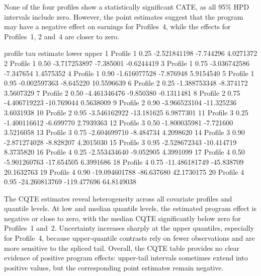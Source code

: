 \documentclass[preprint,12pt,authoryear]{elsarticle}
\renewenvironment{Schunk}{\vspace{0pt}}{\vspace{-0.1\baselineskip}}
\begin{document}
None of the four profiles show a statistically significant  CATE, as all 95\% HPD intervals include zero. However, the point estimates suggest that the program may have a negative effect on earnings for Profiles~4, while the effects for Profiles~1, 2 and~4 are closer to zero.
\begin{Schunk}
\begin{Soutput}
     profile  tau      estimate       lower      upper
1  Profile 1 0.25  -2.521841198   -7.744296  4.0271372
2  Profile 1 0.50  -3.717253897   -7.385001 -0.6244419
3  Profile 1 0.75  -3.036742586   -7.347654  1.4575352
4  Profile 1 0.90  -1.616077528   -7.876948  5.9154540
5  Profile 1 0.95  -0.002597363   -8.645220 10.5596639
6  Profile 2 0.25  -1.388753348   -8.374172  3.5607329
7  Profile 2 0.50  -4.461346476   -9.850380 -0.1311481
8  Profile 2 0.75  -4.406719223  -10.769044  0.5638009
9  Profile 2 0.90  -3.966523104  -11.325236  3.6031938
10 Profile 2 0.95  -3.546162922  -13.181625  6.9877301
11 Profile 3 0.25  -1.400116612   -6.699770  2.7939363
12 Profile 3 0.50  -1.800035981   -7.721600  3.5216058
13 Profile 3 0.75  -2.604699710   -8.484734  4.2098620
14 Profile 3 0.90  -2.871274028   -8.828207  4.2015030
15 Profile 3 0.95  -2.528672343  -10.414719  8.3735820
16 Profile 4 0.25  -2.553434640   -9.052905  4.3991099
17 Profile 4 0.50  -5.901260763  -17.654505  6.3991686
18 Profile 4 0.75 -11.486181749  -45.838709 20.1632763
19 Profile 4 0.90 -19.094601788  -86.637680 42.1730175
20 Profile 4 0.95 -24.260813769 -119.477696 64.8149038
\end{Soutput}
\end{Schunk}



The CQTE estimates reveal heterogeneity across all covariate profiles and quantile levels. At low and median quantile levels, the estimated program effect is negative or close to zero, with the median CQTE significantly below zero for Profiles~1 and~2. Uncertainty increases sharply at the upper quantiles, especially for Profile~4, because upper-quantile contrasts rely on fewer observations and are more sensitive to the spliced tail. Overall, the CQTE table provides no clear evidence of positive program effects: upper-tail intervals sometimes extend into positive values, but the corresponding point estimates remain negative.
\end{document}
